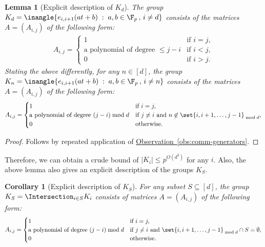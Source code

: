 \documentclass[11pt]{article}
\newcommand{\expref}[2]{\texorpdfstring{\hyperref[#2]{#1~\ref{#2}}}{#1~\ref{#2}}}
\newtheorem{lemma}[theorem]{Lemma}
\newtheorem{corollary}[theorem]{Corollary}
\begin{document}
\begin{lemma}[Explicit description of $K_d$]
  The group $K_d = \inangle{e_{i,i+1}(at + b)\;:\; a,b\in \F_p\,,\, i\neq d}$ 
  consists of
 the %
%
matrices $A = (A_{i,j})$ of the following form:
  \begin{align*}
    A_{i,j} = \begin{cases}
      1 & \text{if }i = j,\\
%
      \text{a polynomial of degree $\leq j - i$} & \text{if }i < j,\\  %
      0 & \text{if }i > j.
    \end{cases}
  \end{align*}
  \noindent 
%
%
%
  Stating the above differently, %
  for any $n \in [d]$, the group 
 $K_n = \inangle{e_{i,i+1}(at + b)\;:\; a,b\in \F_p\,,\, i\neq n}$
%
%
%
consists of
the   %
matrices $A = (A_{i,j})$ of the following form:
  \begin{align*}
    A_{i,j} = \begin{cases}
      1 & \text{if }i = j,\\
      \text{a polynomial of degree $(j - i)\bmod{d}$} & \text{if }j\neq i \text{ and }n\not\in\set{i,i+1,\ldots,j-1}_{\bmod{d}},\\
      0 & \text{otherwise}.
    \end{cases}
  \end{align*}
\end{lemma}
%
%
\begin{proof}
%
Follows by repeated application  %
of \expref{Observation}{obs:comm-generators}. 
\end{proof}

\noindent
Therefore, we can obtain a crude bound of $|K_i| \leq p^{O(d^3)}$ for any $i$. Also, the above lemma also gives an explicit description of the groups $K_S$. 

\begin{corollary}[Explicit description of $K_S$]\label{cor:exp-desc-K_S}
For any subset $S \subseteq [d]$, the group $K_S = \Intersection_{i\in S} K_i$ consists of matrices $A = (A_{i,j})$ of the following form:
\begin{align*}
  A_{i,j} = \begin{cases}
    1 & \text{if }i = j,\\
    \text{a polynomial of degree $(j - i)\bmod{d}$} & \text{if }j\neq i \text{ and }\set{i,i+1,\ldots,j-1}_{\bmod{d}} \cap S = \emptyset,\\
    0 & \text{otherwise}.
  \end{cases}
\end{align*}
\end{corollary}
\end{document}
